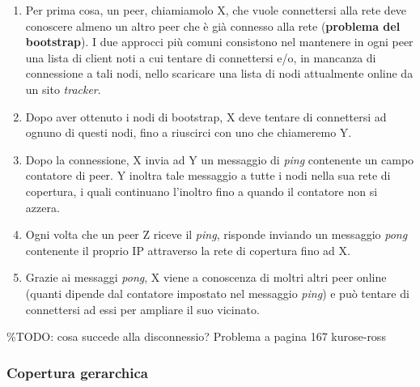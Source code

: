 \begin{enumerate}
\def\labelenumi{\arabic{enumi}.}
\item
  Per prima cosa, un peer, chiamiamolo X, che vuole connettersi alla
  rete deve conoscere almeno un altro peer che è già connesso alla rete
  (\textbf{problema del bootstrap}). I due approcci più comuni
  consistono nel mantenere in ogni peer una lista di client noti a cui
  tentare di connettersi e/o, in mancanza di connessione a tali nodi,
  nello scaricare una lista di nodi attualmente online da un sito
  \emph{tracker}.
\item
  Dopo aver ottenuto i nodi di bootstrap, X deve tentare di connettersi
  ad ognuno di questi nodi, fino a riuscirci con uno che chiameremo Y.
\item
  Dopo la connessione, X invia ad Y un messaggio di \emph{ping}
  contenente un campo contatore di peer. Y inoltra tale messaggio a
  tutte i nodi nella sua rete di copertura, i quali continuano l'inoltro
  fino a quando il contatore non si azzera.
\item
  Ogni volta che un peer Z riceve il \emph{ping}, risponde inviando un
  messaggio \emph{pong} contenente il proprio IP attraverso la rete di
  copertura fino ad X.
\item
  Grazie ai messaggi \emph{pong}, X viene a conoscenza di moltri altri
  peer online (quanti dipende dal contatore impostato nel messaggio
  \emph{ping}) e può tentare di connettersi ad essi per ampliare il suo
  vicinato.
\end{enumerate}

\%TODO: cosa succede alla disconnessio? Problema a pagina 167
kurose-ross

\subsubsection{Copertura gerarchica}\label{copertura-gerarchica}

